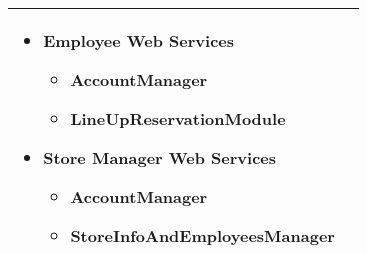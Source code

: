 \begin{center}
{\begin{longtable}{L{2.5cm}L{12cm}}
        \medskip 
        \begin{itemize}
            \item Employee Web Services \begin{itemize}
                \item AccountManager
                \item LineUpReservationModule
            \end{itemize}
            \item Store Manager Web Services \begin{itemize}
                \item AccountManager
                \item StoreInfoAndEmployeesManager
            \end{itemize}
        \end{itemize} \\
        \hline
    \end{longtable}}


\end{center}
